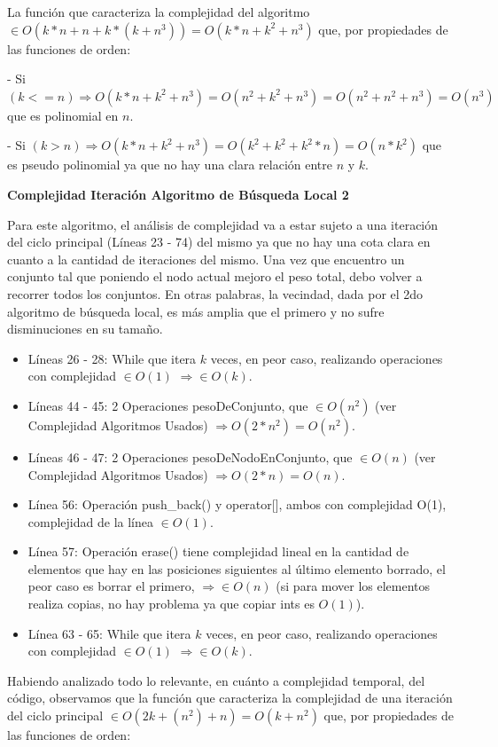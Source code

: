 La función que caracteriza la complejidad del algoritmo $\in O(k*n + n + k*(k + n^3)) = O(k*n + k^2 + n^3)$ que, por propiedades de las funciones de orden:

- Si $(k <= n) \Rightarrow O(k*n + k^2 + n^3) = O(n^2 + k^2 + n^3) = O(n^2 + n^2 + n^3) = O(n^3)$ que es polinomial en $n$.

- Si $(k > n) \Rightarrow O(k*n + k^2 + n^3) = O(k^2 + k^2 + k^2*n) = O(n * k^2)$ que es pseudo polinomial ya que no hay una clara relación entre $n$ y $k$.

\textbf{Complejidad Iteración Algoritmo de Búsqueda Local 2}

Para este algoritmo, el análisis de complejidad va a estar sujeto a una iteración del ciclo principal (Líneas 23 - 74) del mismo ya que no hay una cota clara en cuanto a la cantidad de iteraciones del mismo. Una vez que encuentro un conjunto tal que poniendo el nodo actual mejoro el peso total, debo volver a recorrer todos los conjuntos. En otras palabras, la vecindad, dada por el 2do algoritmo de búsqueda local, es más amplia que el primero y no sufre disminuciones en su tamaño.

\begin{itemize}
\item Líneas 26 - 28: While que itera $k$ veces, en peor caso, realizando operaciones con complejidad $\in O(1)$ $\Rightarrow \in O(k)$.
\item Líneas 44 - 45: 2 Operaciones pesoDeConjunto, que $\in O(n^2)$ (ver Complejidad Algoritmos Usados) $\Rightarrow O(2*n^2) = O(n^2)$.
\item Líneas 46 - 47: 2 Operaciones pesoDeNodoEnConjunto, que $\in O(n)$ (ver Complejidad Algoritmos Usados) $\Rightarrow O(2*n) = O(n)$.
\item Línea 56: Operación push\_back() y operator[], ambos con complejidad O(1), complejidad de la línea $\in O(1)$.
\item Línea 57: Operación erase() tiene complejidad lineal en la cantidad de elementos que hay en las posiciones siguientes al último elemento borrado, el peor caso es borrar el primero, $\Rightarrow \in O(n)$ (si para mover los elementos realiza copias, no hay problema ya que copiar ints es $O(1)$).
\item Línea 63 - 65: While que itera $k$ veces, en peor caso, realizando operaciones con complejidad $\in O(1)$ $\Rightarrow \in O(k)$.
\end{itemize}

Habiendo analizado todo lo relevante, en cuánto a complejidad temporal, del código, observamos que la función que caracteriza la complejidad de una iteración del ciclo principal $\in O(2k + (n^2) + n) = O(k + n^2)$ que, por propiedades de las funciones de orden:

